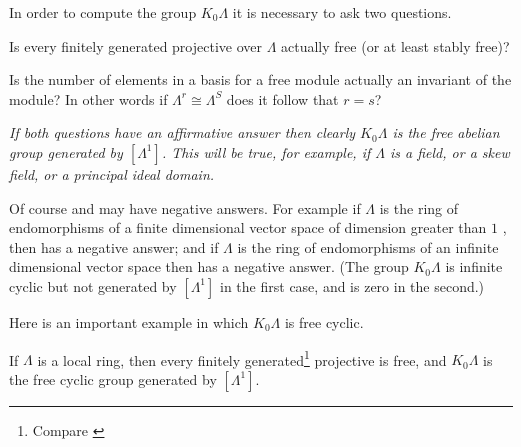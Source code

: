 In order to compute the group $K_{0} \Lambda$ it is necessary to ask two questions.

\begin{quest}\label{quest:1.1.1}
	Is every finitely generated projective over $\Lambda$ actually free (or at least stably free)?
\end{quest}

\begin{quest}\label{quest:1.1.2}
	Is the number of elements in a basis for a free module actually an invariant of the module? In other words if $\Lambda^{r} \cong \Lambda^{S}$ does it follow that $r=s$?
\end{quest}

\textit{If both questions have an affirmative answer then clearly $K_{0} \Lambda$ is the free abelian group generated by $\left[\Lambda^{1}\right]$. This will be true, for example, if $\Lambda$ is a field, or a skew field, or a principal ideal domain.}

Of course  and  may have negative answers. For example if $\Lambda$ is the ring of endomorphisms of a finite dimensional vector space of dimension greater than $1$ , then  has a negative answer; and if $\Lambda$ is the ring of endomorphisms of an infinite dimensional vector space then  has a negative answer. (The group $K_{0} \Lambda$ is infinite cyclic but not generated by $[\Lambda^{1}]$ in the first case, and is zero in the second.)

Here is an important example in which $K_{0} \Lambda$ is free cyclic.

\begin{lem}\label{lem:1.2}
	If $\Lambda$ is a local ring, then every finitely generated\footnote{Compare \cite{kaplansky:projective}} projective is free, and $K_{0} \Lambda$ is the free cyclic group generated by $\left[\Lambda^{1}\right]$.
\end{lem}

